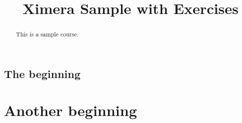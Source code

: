 \documentclass{xourse}
\title{Ximera Sample with Exercises}
\begin{document}
\begin{abstract}
  This is a sample course.
\end{abstract}
\maketitle

\begin{graded}{50}
\part{The beginning}
\begin{graded}{20}
  \chapterstyle
  \sectionstyle
\end{graded}
\begin{graded}{10}
\end{graded}
\end{graded}

\part{Another beginning}
\begin{graded}{50}
  \chapterstyle
  \sectionstyle
\end{graded}
\end{document}

